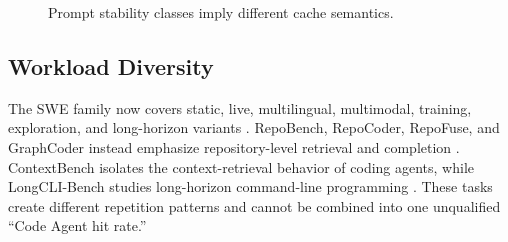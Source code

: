\documentclass[conference,10pt]{IEEEtran}
\begin{document}
\begin{figure}[t]
\centering
{}
\caption{Prompt stability classes imply different cache semantics.}
\label{fig:stability}
\end{figure}

\subsection{Workload Diversity}

The SWE family now covers static, live, multilingual, multimodal, training, exploration, and long-horizon variants \cite{zhang2025swebench,zan2025multiswebench,pan2024training,yang2024swebench,zhang2026sweexplore,le2025sweevo}. RepoBench, RepoCoder, RepoFuse, and GraphCoder instead emphasize repository-level retrieval and completion \cite{liu2023repobench,zhang2023repocoder,liang2024repofuse,liu2024graphcoder}. ContextBench isolates the context-retrieval behavior of coding agents, while LongCLI-Bench studies long-horizon command-line programming \cite{li2026contextbench,feng2026longclibench}. These tasks create different repetition patterns and cannot be combined into one unqualified ``Code Agent hit rate.''
\end{document}
